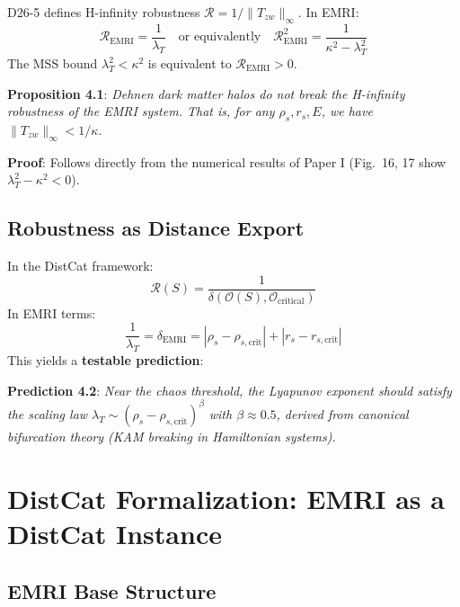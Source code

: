 \documentclass[12pt]{article}
\begin{document}
D26-5 defines H-infinity robustness $\mathcal{R} = 1/\|T_{zw}\|_\infty$. In EMRI:
\begin{equation}
\mathcal{R}_{\text{EMRI}} = \frac{1}{\lambda_T} \quad \text{or equivalently} \quad \mathcal{R}_{\text{EMRI}}^2 = \frac{1}{\kappa^2 - \lambda_T^2}
\end{equation}
The MSS bound $\lambda_T^2 < \kappa^2$ is equivalent to $\mathcal{R}_{\text{EMRI}} > 0$.

\textbf{Proposition 4.1}: \textit{Dehnen dark matter halos do not break the H-infinity robustness of the EMRI system. That is, for any $\rho_s, r_s, E$, we have $\|T_{zw}\|_\infty < 1/\kappa$.}

\textbf{Proof}: Follows directly from the numerical results of Paper I (Fig.~16, 17 show $\lambda_T^2 - \kappa^2 < 0$).

\subsection{Robustness as Distance Export}

In the DistCat framework:
\begin{equation}
\mathcal{R}(S) = \frac{1}{\delta(\mathcal{O}(S), \mathcal{O}_{\text{critical}})}
\end{equation}
In EMRI terms:
\begin{equation}
\frac{1}{\lambda_T} = \delta_{\text{EMRI}} = |\rho_s - \rho_{s,\text{crit}}| + |r_s - r_{s,\text{crit}}|
\end{equation}
This yields a \textbf{testable prediction}:

\textbf{Prediction 4.2}: \textit{Near the chaos threshold, the Lyapunov exponent should satisfy the scaling law $\lambda_T \sim (\rho_s - \rho_{s,\text{crit}})^\beta$ with $\beta \approx 0.5$, derived from canonical bifurcation theory (KAM breaking in Hamiltonian systems).}

\section{DistCat Formalization: EMRI as a DistCat Instance}

\subsection{EMRI Base Structure}
\end{document}
